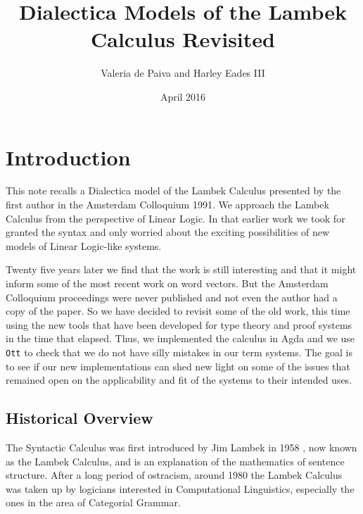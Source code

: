 \documentclass{article}
\title{Dialectica Models of the Lambek Calculus Revisited}
\author{Valeria de Paiva and Harley Eades III}
\date{April 2016}
\begin{document}
\maketitle

\section*{Introduction}

This note recalls a Dialectica model of the Lambek Calculus presented
by the first author in the Amsterdam Colloquium 1991. We approach the
Lambek Calculus from the perspective of Linear Logic. In that earlier
work we took for granted the syntax and only worried about the
exciting possibilities of new models of Linear Logic-like systems.

Twenty five years later we find that the work is still interesting and
that it might inform some of the most recent work on word vectors. But
the Amsterdam Colloquium proceedings were never published and not even
the author had a copy of the paper. So we have decided to revisit some
of the old work, this time using the new tools that have been
developed for type theory and proof systems in the time that
elapsed. Thus, we implemented the calculus in Agda and we use
\texttt{Ott} \cite{Sewell:2010} to check that we do not have silly
mistakes in our term systems. The goal is to see if our new
implementations can shed new light on some of the issues that remained
open on the applicability and fit of the systems to their intended
uses.

\subsection*{Historical Overview}
The Syntactic Calculus was first introduced by Jim Lambek in 1958 \cite{Lambek1958}, now
known as the Lambek Calculus, and is an explanation of the mathematics
of sentence structure.  After a long period of ostracism, around 1980
the Lambek Calculus was taken up by logicians interested in
Computational Linguistics, especially the ones in the area of
Categorial Grammar.
\end{document}
